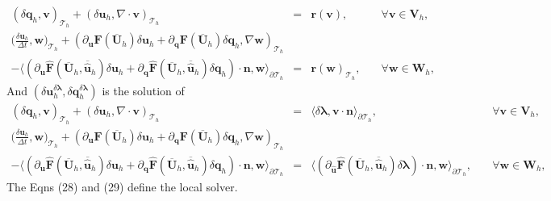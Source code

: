 \documentclass[11pt]{article}
\begin{document}
\begin{equation}
\begin{array}{rcll}
(\delta \bm{q}_h, \bm{v})_{\mathcal{T}_h} + (\delta \bm{u}_h, \nabla \cdot \bm{v})_{\mathcal{T}_h}  & = & \bm{r}(\bm{v}), & \quad \forall \bm{v} \in \bm{V}_h, \\[2ex] 
\displaystyle \Big(\frac{\delta \bm{u}_h}{\Delta t}, \bm{w} \Big)_{\mathcal{T}_h} + (\partial_{\bm{u}} \bm{F} (\overline{\bm{U}}_h) \delta \bm{u}_h + \partial_{\bm{q}} \bm{F} (\overline{\bm{U}}_h) \delta \bm{q}_h, \nabla \bm{w})_{\mathcal{T}_h} & & \\[2ex]
- \langle (\partial_{\bm{u}} \widehat{\bm{F}} (\overline{\bm{U}}_h, \overline{\widehat{\bm{u}}}_h) \delta \bm{u}_h + \partial_{{\bm{q}}} \widehat{\bm{F}} (\overline{\bm{U}}_h, \overline{\widehat{\bm{u}}}_h) \delta {\bm{q}}_h) \cdot \bm{n}, \bm{w} \rangle_{\partial \mathcal{T}_h}  & = &  \bm{r}(\bm{w})_{\mathcal{T}_h},  & \quad \forall \bm{w} \in \bm{W}_h,
\end{array}
\end{equation}
And $(\delta \bm{u}_h^{\delta \bm{\lambda}},\delta \bm{q}_h^{\delta \bm{\lambda}})$ is the solution of
\begin{equation}
\begin{array}{rcll}
(\delta \bm{q}_h, \bm{v})_{\mathcal{T}_h} + (\delta \bm{u}_h, \nabla \cdot \bm{v})_{\mathcal{T}_h}  & = & \langle \delta {\bm{\lambda}}, \bm{v} \cdot \bm{n} \rangle_{\partial \mathcal{T}_h} , & \quad \forall \bm{v} \in \bm{V}_h, \\[2ex] 
\displaystyle \Big(\frac{\delta \bm{u}_h}{\Delta t}, \bm{w} \Big)_{\mathcal{T}_h} + (\partial_{\bm{u}} \bm{F} (\overline{\bm{U}}_h) \delta \bm{u}_h + \partial_{\bm{q}} \bm{F} (\overline{\bm{U}}_h) \delta \bm{q}_h, \nabla \bm{w})_{\mathcal{T}_h} & & \\[2ex]
- \langle (\partial_{\bm{u}} \widehat{\bm{F}} (\overline{\bm{U}}_h, \overline{\widehat{\bm{u}}}_h) \delta \bm{u}_h + \partial_{{\bm{q}}} \widehat{\bm{F}} (\overline{\bm{U}}_h, \overline{\widehat{\bm{u}}}_h) \delta {\bm{q}}_h) \cdot \bm{n}, \bm{w} \rangle_{\partial \mathcal{T}_h}  & = &  \langle (\partial_{\widehat{\bm{u}}} \widehat{\bm{F}} (\overline{\bm{U}}_h, \overline{\widehat{\bm{u}}}_h) \delta {\bm{\lambda}}) \cdot \bm{n}, \bm{w} \rangle_{\partial \mathcal{T}_h},  & \quad \forall \bm{w} \in \bm{W}_h,
\end{array}
\end{equation}
The Eqns (28) and (29) define the local solver.
\end{document}
